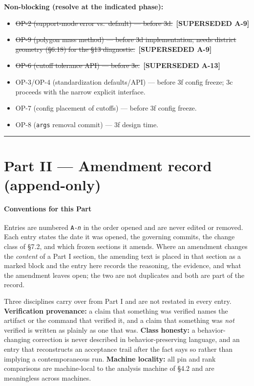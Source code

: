 \documentclass[
  10pt,
]{article}
\providecommand{\tightlist}{%
  \setlength{\itemsep}{0pt}\setlength{\parskip}{0pt}}
\newcommand{\amdstrike}[1]{\sout{#1}}
\newcommand{\amdstrike}[1]{\textcolor{supcolor}{#1}}
\newcommand{\supsd}[2]{{\color{supcolor}\amdstrike{#2}}~{\color{amdcolor}\footnotesize\textbf{[SUPERSEDED #1]}}}
\begin{document}
\textbf{Non-blocking (resolve at the indicated phase):}

\begin{itemize}
\tightlist
\item
  \supsd{A-9}{OP-2 (support-mode error vs.~default) --- before 3d.}
\item
  \supsd{A-9}{OP-9 (polygon mass method) --- before 3d implementation; needs district geometry (§6.18) for the §13 diagnostic.}
\item
  \supsd{A-13}{OP-6 (cutoff tolerance API) --- before 3e.}
\item
  OP-3/OP-4 (standardization defaults/API) --- before 3f config freeze; 3c proceeds with the narrow explicit interface.
\item
  OP-7 (config placement of cutoffs) --- before 3f config freeze.
\item
  OP-8 (\texttt{args} removal commit) --- 3f design time.
\end{itemize}


\begin{center}\rule{0.5\linewidth}{0.5pt}\end{center}

\hypertarget{part-ii}{%
\part*{Part II --- Amendment record (append-only)}\label{part-ii}}

\hypertarget{amendment-conventions}{%
\subsection{Conventions for this Part}\label{amendment-conventions}}

Entries are numbered \texttt{A-\emph{n}} in the order opened and are never edited or removed. Each entry states the date it was opened, the governing commits, the change class of §7.2, and which frozen sections it amends. Where an amendment changes the \emph{content} of a Part I section, the amending text is placed in that section as a marked block and the entry here records the reasoning, the evidence, and what the amendment leaves open; the two are not duplicates and both are part of the record.

Three disciplines carry over from Part I and are not restated in every entry. \textbf{Verification provenance:} a claim that something was verified names the artifact or the command that verified it, and a claim that something was \emph{not} verified is written as plainly as one that was. \textbf{Class honesty:} a behavior-changing correction is never described in behavior-preserving language, and an entry that reconstructs an acceptance trail after the fact says so rather than implying a contemporaneous run. \textbf{Machine locality:} all pin and rank comparisons are machine-local to the analysis machine of §4.2 and are meaningless across machines.
\end{document}
